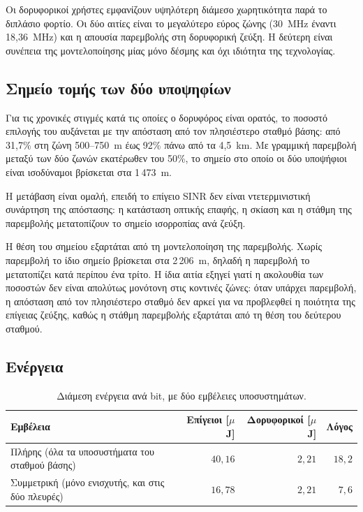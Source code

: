 \documentclass[11pt,a4paper]{article}
\begin{document}
Οι δορυφορικοί χρήστες εμφανίζουν υψηλότερη διάμεσο χωρητικότητα παρά το
διπλάσιο φορτίο. Οι δύο αιτίες είναι το μεγαλύτερο εύρος ζώνης (30~MHz έναντι
18,36~MHz) και η απουσία παρεμβολής στη δορυφορική ζεύξη. Η δεύτερη είναι
συνέπεια της μοντελοποίησης μίας μόνο δέσμης και όχι ιδιότητα της τεχνολογίας.

\subsection{Σημείο τομής των δύο υποψηφίων}
\label{sec:crossover}

Για τις χρονικές στιγμές κατά τις οποίες ο δορυφόρος είναι ορατός, το ποσοστό
επιλογής του αυξάνεται με την απόσταση από τον πλησιέστερο σταθμό βάσης: από
31,7\% στη ζώνη 500–750~m έως 92\% πάνω από τα 4,5~km. Με γραμμική παρεμβολή
μεταξύ των δύο ζωνών εκατέρωθεν του 50\%, το σημείο στο οποίο οι δύο υποψήφιοι
είναι ισοδύναμοι βρίσκεται στα 1\,473~m.

Η μετάβαση είναι ομαλή, επειδή το επίγειο SINR δεν είναι ντετερμινιστική
συνάρτηση της απόστασης: η κατάσταση οπτικής επαφής, η σκίαση και η στάθμη της
παρεμβολής μετατοπίζουν το σημείο ισορροπίας ανά ζεύξη.

Η θέση του σημείου εξαρτάται από τη μοντελοποίηση της παρεμβολής. Χωρίς
παρεμβολή το ίδιο σημείο βρίσκεται στα 2\,206~m, δηλαδή η παρεμβολή το
μετατοπίζει κατά περίπου ένα τρίτο. Η ίδια αιτία εξηγεί γιατί η ακολουθία των
ποσοστών δεν είναι απολύτως μονότονη στις κοντινές ζώνες: όταν υπάρχει
παρεμβολή, η απόσταση από τον πλησιέστερο σταθμό δεν αρκεί για να προβλεφθεί η
ποιότητα της επίγειας ζεύξης, καθώς η στάθμη παρεμβολής εξαρτάται από τη θέση
του δεύτερου σταθμού.

\subsection{Ενέργεια}

\begin{table}[htbp]
\centering\small
\caption{Διάμεση ενέργεια ανά bit, με δύο εμβέλειες υποσυστημάτων.}
\label{tab:energy}
\begin{tabular}{@{}lrrr@{}}
\toprule
Εμβέλεια & Επίγειοι [$\mu$J] & Δορυφορικοί [$\mu$J] & Λόγος \\
\midrule
Πλήρης (όλα τα υποσυστήματα του σταθμού βάσης) & $40{,}16$ & $2{,}21$ & $18{,}2$ \\
Συμμετρική (μόνο ενισχυτής, και στις δύο πλευρές) & $16{,}78$ & $2{,}21$ & $7{,}6$ \\
\bottomrule
\end{tabular}
\end{table}
\end{document}
